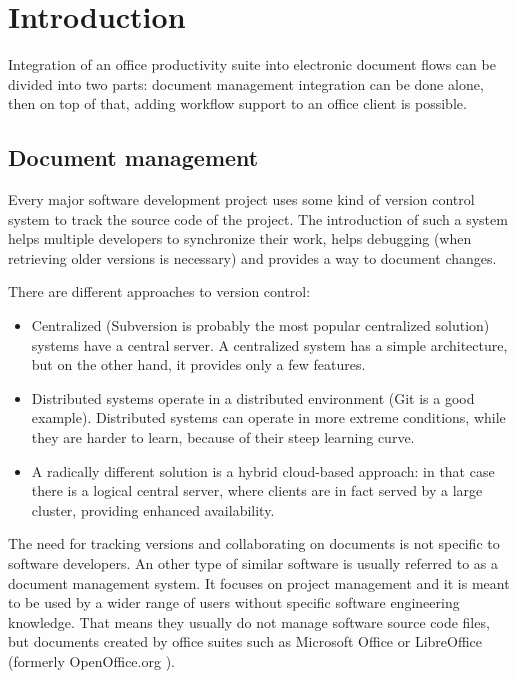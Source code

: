 \chapter{Introduction}

Integration of an office productivity suite into electronic document flows can be
divided into two parts: document management integration can be done alone, then
on top of that, adding workflow support to an office client is possible.

\section{Document management}
\label{sec:intro-docmgmt}

Every major software development project uses some kind of version control
system to track the source code of the project. The introduction of such a system
helps multiple developers to synchronize their work, helps debugging (when
retrieving older versions is necessary) and provides a way to document changes.

There are different approaches to version control:

\begin{itemize}
\item Centralized (Subversion \cite{subversion} is probably the most popular
centralized solution) systems have a central server. A centralized system has a
simple architecture, but on the other hand, it provides only a few features.
\item Distributed systems operate in a distributed environment (Git \cite{git}
is a good example). Distributed systems can operate in more extreme conditions,
while they are harder to learn, because of their steep learning curve.
\item A radically different solution is a hybrid cloud-based approach: in that
case there is a logical central server, where clients are in fact served by a
large cluster, providing enhanced availability.
\end{itemize}

The need for tracking versions and collaborating on documents is not specific to
software developers. An other type of similar software is usually referred to as
a document management system. It focuses on project management and it is meant to be
used by a wider range of users without specific software engineering knowledge.
That means they usually do not manage software source code files, but documents
created by office suites such as Microsoft Office \cite{mso} or
LibreOffice \cite{lo} (formerly OpenOffice.org \cite{ooo}).

